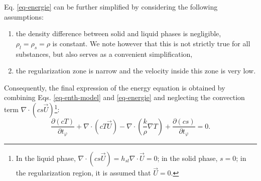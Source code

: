 
\noindent Eq. \ref{eq-energie} can be further simplified by considering the following assumptions: 
\begin{enumerate}[label=(\roman*)]
\item the density difference between solid and liquid phases is negligible, \ie $\rho_l=\rho_s=\rho$ is constant. 
We note however that this is not strictly true for all substances, but also serves as a convenient simplification,
\item the regularization zone is narrow and the velocity inside this zone is very low. 
\end{enumerate}
Consequently, the final expression of the energy equation is obtained by combining Eqs. \ref{eq-enth-model}  and \ref{eq-energie} and  neglecting the convection term $\nabla \cdot ( c s \vec{U})$\footnote{In the liquid phase, $\nabla \cdot ( c s \vec{U})  = h_{sl} \nabla \cdot  \vec{U}=0$; in the solid phase, $s=0$; in the regularization region, it is assumed that $\vec{U}=0.$}:
\begin{equation}\label{eq-energie-enth-model}
\frac{\partial \left(c T\right)}{\partial t_{\varphi}} + \nabla \cdot\left( c T \vec{U}\right) -
\nabla \cdot\left( \frac{k}{\rho} \nabla T \right) +  \frac{\partial \left(c s\right)}{\partial t_{\varphi}}  = 0.
\end{equation}

